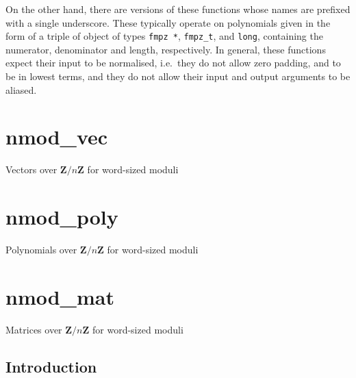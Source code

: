 \documentclass[a4paper,10pt]{book}
\newcommand{\Z}{\mathbf{Z}}%
\newcommand{\code}{\lstinline}
\begin{document}
On the other hand, there are versions of these functions whose names are 
prefixed with a single underscore.  These typically operate on polynomials 
given in the form of a triple of object of types \code{fmpz *}, 
\code{fmpz_t}, and \code{long}, containing the numerator, denominator and 
length, respectively.  In general, these functions expect their input to 
be normalised, i.e.\ they do not allow zero padding, and to be in lowest 
terms, and they do not allow their input and output arguments to be aliased.




\chapter{nmod\_vec}
\epigraph{Vectors over $\Z / n \Z$ for word-sized moduli}{}




\chapter{nmod\_poly}
\epigraph{Polynomials over $\Z / n \Z$ for word-sized moduli}{}




\chapter{nmod\_mat}
\epigraph{Matrices over $\Z / n \Z$ for word-sized moduli}{}

\section{Introduction}
\end{document}
